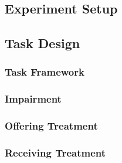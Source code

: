 \documentclass{article}
\begin{document}
\subsection*{Experiment Setup} %


\subsection*{Task Design}
\subsubsection*{Task Framework} %


\subsubsection*{Impairment} %


\subsubsection*{Offering Treatment} %


\subsubsection*{Receiving Treatment} %
\end{document}
